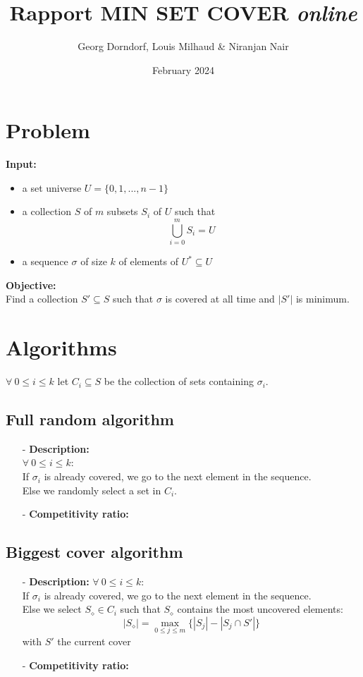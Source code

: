 \documentclass{article}
\title{Rapport MIN SET COVER \emph{online}}
\author{Georg Dorndorf, Louis Milhaud \& Niranjan Nair}
\date{February 2024}
\begin{document}
\maketitle

\section{Problem}
\textbf{Input:}
\begin{itemize}
    \item a set universe $U = \{0, 1, ..., n-1\}$
    \item a collection $S$ of $m$ subsets $S_i$ of $U$ such that $$\bigcup_{i = 0}^m S_i = U$$
    \item a sequence $\sigma$ of size $k$ of elements of $U^* \subseteq U$
\end{itemize}
\textbf{Objective:}\\
Find a collection $S' \subseteq S$ such that $\sigma$ is covered at all time and $|S'|$ is minimum.

\section{Algorithms}
$\forall\ 0 \leq i \leq k$ let $C_i \subseteq S$ be the collection of sets containing $\sigma_i$.\\
\subsection{Full random algorithm}
\begin{itemize}
    \item[-] \textbf{Description:}\\
    $\forall\ 0 \leq i \leq k$:\\
    If $\sigma_i$ is already covered, we go to the next element in the sequence.\\
    Else we randomly select a set in $C_i$.
    \item[-] \textbf{Competitivity ratio:}
\end{itemize}
\subsection{Biggest cover algorithm}
\begin{itemize}
    \item[-] \textbf{Description:}
    $\forall\ 0 \leq i \leq k$:\\
    If $\sigma_i$ is already covered, we go to the next element in the sequence.\\
    Else we select $S_\diamond\in C_i$ such that $S_\diamond$ contains the most uncovered elements:
    $$|S_\diamond| = \max_{0\leq j\leq m}\{|S_j| - |S_j\cap S'|\}$$ with $S'$ the current cover
    \item[-] \textbf{Competitivity ratio:}
\end{itemize}
\end{document}
